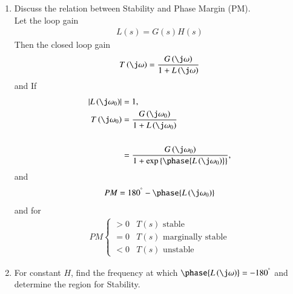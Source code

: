 \begin{enumerate}[label=\thesection.\arabic*.,ref=\thesection.\theenumi]
\item Discuss the relation between Stability and Phase Margin (PM).\\
\solution Let the loop gain
\begin{align}
L(s) = G(s)H(s)
\end{align}
Then the closed loop gain 
\begin{align}
T\brak{\j\omega} = \frac{G\brak{\j\omega}}{1+L\brak{\j\omega}}%
\end{align}
and 
%
If 
\begin{align}
\abs{L\brak{\j\omega_0}} &= 1,
\\
T\brak{\j\omega_0} &= \frac{G\brak{\j\omega_0}}{1+L\brak{\j\omega_0}}\\
\\
 &= \frac{G\brak{\j\omega_0}}{1+\exp\cbrak{\phase{L\brak{\j\omega_0}}}},
\end{align}
and 
\begin{align}
PM = 180^{\degree} - \phase{L\brak{\j\omega_0}}
\end{align}
%
and for
\begin{align}
PM
\begin{cases}
> 0 & T(s) \text{ stable}
\\
= 0 & T(s) \text{ marginally stable}
\\
< 0 & T(s) \text{ unstable}
\end{cases}
\end{align}
%
%
%
\item For constant $H$, find the frequency at which $\phase{L\brak{\j\omega}} = -180^{\degree}$ and determine the region for Stability.
\solution


\end{enumerate}
